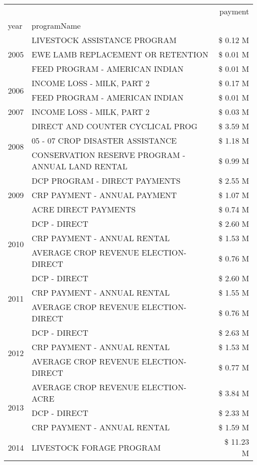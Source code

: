 \begin{tabular}{llr}
\toprule
 &  & payment \\
year & programName &  \\
\midrule
\multirow[t]{3}{*}{2005} & LIVESTOCK ASSISTANCE PROGRAM & \$ 0.12 M \\
 & EWE LAMB REPLACEMENT OR RETENTION & \$ 0.01 M \\
 & FEED PROGRAM - AMERICAN INDIAN & \$ 0.01 M \\
\cline{1-3}
\multirow[t]{2}{*}{2006} & INCOME LOSS - MILK, PART 2 & \$ 0.17 M \\
 & FEED PROGRAM - AMERICAN INDIAN & \$ 0.01 M \\
\cline{1-3}
2007 & INCOME LOSS - MILK, PART 2 & \$ 0.03 M \\
\cline{1-3}
\multirow[t]{3}{*}{2008} & DIRECT AND COUNTER CYCLICAL PROG & \$ 3.59 M \\
 & 05 - 07 CROP DISASTER ASSISTANCE & \$ 1.18 M \\
 & CONSERVATION RESERVE PROGRAM - ANNUAL LAND RENTAL & \$ 0.99 M \\
\cline{1-3}
\multirow[t]{3}{*}{2009} & DCP PROGRAM - DIRECT PAYMENTS & \$ 2.55 M \\
 & CRP PAYMENT - ANNUAL PAYMENT & \$ 1.07 M \\
 & ACRE DIRECT PAYMENTS & \$ 0.74 M \\
\cline{1-3}
\multirow[t]{3}{*}{2010} & DCP - DIRECT & \$ 2.60 M \\
 & CRP PAYMENT - ANNUAL RENTAL & \$ 1.53 M \\
 & AVERAGE CROP REVENUE ELECTION-DIRECT & \$ 0.76 M \\
\cline{1-3}
\multirow[t]{3}{*}{2011} & DCP - DIRECT & \$ 2.60 M \\
 & CRP PAYMENT - ANNUAL RENTAL & \$ 1.55 M \\
 & AVERAGE CROP REVENUE ELECTION-DIRECT & \$ 0.76 M \\
\cline{1-3}
\multirow[t]{3}{*}{2012} & DCP - DIRECT & \$ 2.63 M \\
 & CRP PAYMENT - ANNUAL RENTAL & \$ 1.53 M \\
 & AVERAGE CROP REVENUE ELECTION-DIRECT & \$ 0.77 M \\
\cline{1-3}
\multirow[t]{3}{*}{2013} & AVERAGE CROP REVENUE ELECTION-ACRE & \$ 3.84 M \\
 & DCP - DIRECT & \$ 2.33 M \\
 & CRP PAYMENT - ANNUAL RENTAL & \$ 1.59 M \\
\cline{1-3}
\multirow[t]{3}{*}{2014} & LIVESTOCK FORAGE PROGRAM & \$ 11.23 M \\

\end{tabular}
